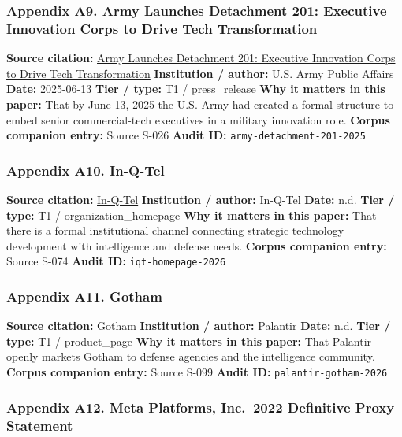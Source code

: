 \documentclass[
  american,
  11pt,
  letterpaper,
]{article}
\begin{document}
\subsubsection{Appendix A9. Army Launches Detachment 201: Executive
Innovation Corps to Drive Tech
Transformation}\label{appendix-a9-army-launches-detachment-201-executive-innovation-corps-to-drive-tech-transformation}

\textbf{Source citation:}
\href{https://www.army.mil/article/286317/army_launches_detachment_201_executive_innovation_corps_to_drive_tech_transformation}{Army
Launches Detachment 201: Executive Innovation Corps to Drive Tech
Transformation} \textbf{Institution / author:} U.S. Army Public Affairs
\textbf{Date:} 2025-06-13 \textbf{Tier / type:} T1 / press\_release
\textbf{Why it matters in this paper:} That by June 13, 2025 the U.S.
Army had created a formal structure to embed senior commercial-tech
executives in a military innovation role. \textbf{Corpus companion
entry:} Source S-026 \textbf{Audit ID:}
\texttt{army-detachment-201-2025}

\subsubsection{Appendix A10. In-Q-Tel}\label{appendix-a10-in-q-tel}

\textbf{Source citation:} \href{https://www.iqt.org/}{In-Q-Tel}
\textbf{Institution / author:} In-Q-Tel \textbf{Date:} n.d. \textbf{Tier
/ type:} T1 / organization\_homepage \textbf{Why it matters in this
paper:} That there is a formal institutional channel connecting
strategic technology development with intelligence and defense needs.
\textbf{Corpus companion entry:} Source S-074 \textbf{Audit ID:}
\texttt{iqt-homepage-2026}

\subsubsection{Appendix A11. Gotham}\label{appendix-a11-gotham}

\textbf{Source citation:}
\href{https://www.palantir.com/platforms/gotham/}{Gotham}
\textbf{Institution / author:} Palantir \textbf{Date:} n.d. \textbf{Tier
/ type:} T1 / product\_page \textbf{Why it matters in this paper:} That
Palantir openly markets Gotham to defense agencies and the intelligence
community. \textbf{Corpus companion entry:} Source S-099 \textbf{Audit
ID:} \texttt{palantir-gotham-2026}

\subsubsection{Appendix A12. Meta Platforms, Inc.~2022 Definitive Proxy
Statement}\label{appendix-a12-meta-platforms-inc-2022-definitive-proxy-statement}
\end{document}

